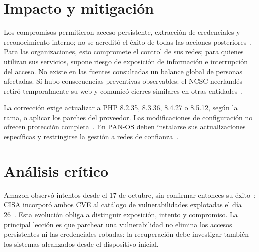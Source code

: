 \section{Impacto y mitigación}
Los compromisos permitieron acceso persistente, extracción de
credenciales y reconocimiento interno; no se acreditó el éxito
de todas las acciones posteriores~\cite{dream2026php}.
Para las organizaciones, esto compromete el control de sus
redes; para quienes utilizan sus servicios, supone riesgo de
exposición de información e interrupción del acceso.
No existe en las fuentes consultadas un balance global de
personas afectadas. Sí hubo consecuencias preventivas observables:
el NCSC neerlandés retiró temporalmente su web y comunicó
cierres similares en otras entidades~\cite{ncsc2026php}.

La corrección exige actualizar a PHP 8.2.35, 8.3.36, 8.4.27
o 8.5.12, según la rama, o aplicar los parches del proveedor.
Las modificaciones de configuración no ofrecen protección
completa~\cite{php2026aviso}. En PAN-OS deben instalarse sus
actualizaciones específicas y restringirse la gestión a redes
de confianza~\cite{unit422026php}.

\section{Análisis crítico}
Amazon observó intentos desde el 17 de octubre, sin confirmar
entonces su éxito~\cite{aws2026php}; CISA incorporó ambos CVE
al catálogo de vulnerabilidades explotadas el
día 26~\cite{cisa2026kev}.
Esta evolución obliga a distinguir exposición, intento y
compromiso. La principal lección es que parchear una
vulnerabilidad no elimina los accesos persistentes ni las
credenciales robadas: la recuperación debe investigar también
los sistemas alcanzados desde el dispositivo inicial.